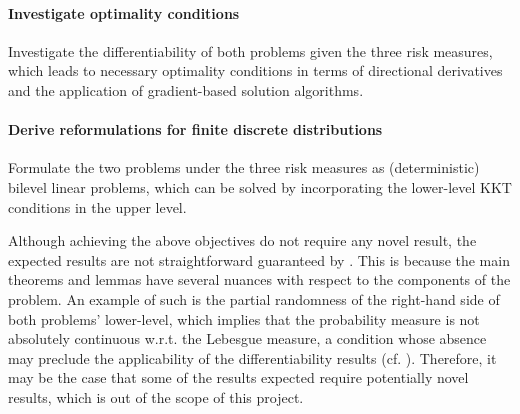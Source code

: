 \documentclass[12pt]{article}
\begin{document}
\paragraph{Investigate optimality conditions}
Investigate the differentiability of both problems given the three risk measures, which leads to necessary optimality conditions in terms of directional derivatives and the application of gradient-based solution algorithms.
\paragraph{Derive reformulations for finite discrete distributions}
Formulate the two problems under the three risk measures as (deterministic) bilevel linear problems, which can be solved by incorporating the lower-level KKT conditions in the upper level.

Although achieving the above objectives do not require any novel result, the expected results are not straightforward guaranteed by \citet{burtscheidtRiskAverseModelsBilevel2020}.
This is because the main theorems and lemmas have several nuances with respect to the components of the problem.
An example of such is the partial randomness of the right-hand side of both problems' lower-level, which implies that the probability measure is not absolutely continuous w.r.t. the Lebesgue measure, a condition whose absence may preclude the applicability of the differentiability results (cf. \cite[Sec.~4]{burtscheidtRiskAverseModelsBilevel2020}).
Therefore, it may be the case that some of the results expected require potentially novel results, which is out of the scope of this project.





% 
\printbibliography
    
\end{document}
